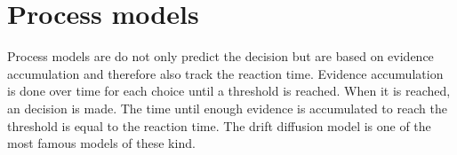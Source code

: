\section{Process models}
Process models are do not only predict the decision but are based on evidence accumulation and therefore also track the reaction time. Evidence accumulation is done over time for each choice until a threshold is reached. When it is reached, an decision is made. The time until enough evidence is accumulated to reach the threshold is equal to the reaction time. The drift diffusion model is one of the most famous models of these kind. 
